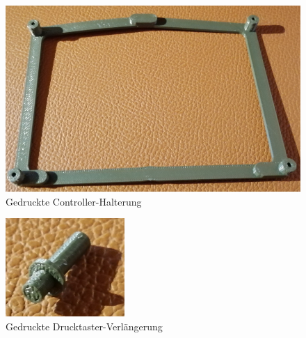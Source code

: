 \begin{minipage}[b]{0.54\textwidth}
\centering
\vspace{-6mm}
\begin{figure}[H] %
\includegraphics[width=.85\textwidth]{sec2/images/3DAnbaukomponenten/Druckbilder/ControllerHalterungDruck} 
\centering
\captionsetup{width=.95\textwidth}
\caption[Gedruckte Controller-Halterung]{Gedruckte Controller-Halterung}\centering
\label{fig:ControllerHalterungDruck}
\end{figure}
\end{minipage}
\begin{minipage}[b]{0.36\textwidth}
\vspace{-6mm}
\begin{figure}[H] %
\includegraphics[width=.8\textwidth]{sec2/images/3DAnbaukomponenten/Druckbilder/DruckTasterDruck} 
\centering
\captionsetup{width=.95\textwidth}
\caption[Gedruckte Drucktaster-Verlängerung]{Gedruckte Drucktaster-Verlängerung}
\centering
\label{fig:DruckTasterDruck}
\end{figure}
\end{minipage}


